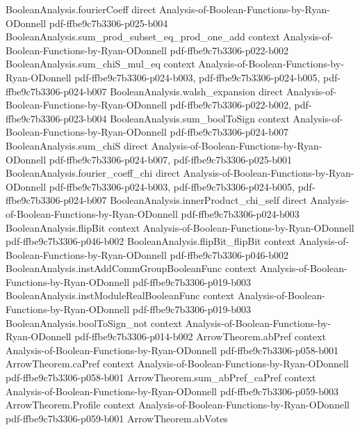 \begin{lemma}
\proofstep
  {BooleanAnalysis.fourierCoeff}
  {direct}
  {Analysis-of-Boolean-Functions-by-Ryan-ODonnell}
  {pdf-ffbe9c7b3306-p025-b004}
\proofstep
  {BooleanAnalysis.sum_prod_subset_eq_prod_one_add}
  {context}
  {Analysis-of-Boolean-Functions-by-Ryan-ODonnell}
  {pdf-ffbe9c7b3306-p022-b002}
\proofstep
  {BooleanAnalysis.sum_chiS_mul_eq}
  {context}
  {Analysis-of-Boolean-Functions-by-Ryan-ODonnell}
  {pdf-ffbe9c7b3306-p024-b003,
    pdf-ffbe9c7b3306-p024-b005,
    pdf-ffbe9c7b3306-p024-b007}
\proofstep
  {BooleanAnalysis.walsh_expansion}
  {direct}
  {Analysis-of-Boolean-Functions-by-Ryan-ODonnell}
  {pdf-ffbe9c7b3306-p022-b002,
    pdf-ffbe9c7b3306-p023-b004}
\proofstep
  {BooleanAnalysis.sum_boolToSign}
  {context}
  {Analysis-of-Boolean-Functions-by-Ryan-ODonnell}
  {pdf-ffbe9c7b3306-p024-b007}
\proofstep
  {BooleanAnalysis.sum_chiS}
  {direct}
  {Analysis-of-Boolean-Functions-by-Ryan-ODonnell}
  {pdf-ffbe9c7b3306-p024-b007,
    pdf-ffbe9c7b3306-p025-b001}
\proofstep
  {BooleanAnalysis.fourier_coeff_chi}
  {direct}
  {Analysis-of-Boolean-Functions-by-Ryan-ODonnell}
  {pdf-ffbe9c7b3306-p024-b003,
    pdf-ffbe9c7b3306-p024-b005,
    pdf-ffbe9c7b3306-p024-b007}
\proofstep
  {BooleanAnalysis.innerProduct_chi_self}
  {direct}
  {Analysis-of-Boolean-Functions-by-Ryan-ODonnell}
  {pdf-ffbe9c7b3306-p024-b003}
\proofstep
  {BooleanAnalysis.flipBit}
  {context}
  {Analysis-of-Boolean-Functions-by-Ryan-ODonnell}
  {pdf-ffbe9c7b3306-p046-b002}
\proofstep
  {BooleanAnalysis.flipBit_flipBit}
  {context}
  {Analysis-of-Boolean-Functions-by-Ryan-ODonnell}
  {pdf-ffbe9c7b3306-p046-b002}
\proofstep
  {BooleanAnalysis.instAddCommGroupBooleanFunc}
  {context}
  {Analysis-of-Boolean-Functions-by-Ryan-ODonnell}
  {pdf-ffbe9c7b3306-p019-b003}
\proofstep
  {BooleanAnalysis.instModuleRealBooleanFunc}
  {context}
  {Analysis-of-Boolean-Functions-by-Ryan-ODonnell}
  {pdf-ffbe9c7b3306-p019-b003}
\proofstep
  {BooleanAnalysis.boolToSign_not}
  {context}
  {Analysis-of-Boolean-Functions-by-Ryan-ODonnell}
  {pdf-ffbe9c7b3306-p014-b002}
\proofstep
  {ArrowTheorem.abPref}
  {context}
  {Analysis-of-Boolean-Functions-by-Ryan-ODonnell}
  {pdf-ffbe9c7b3306-p058-b001}
\proofstep
  {ArrowTheorem.caPref}
  {context}
  {Analysis-of-Boolean-Functions-by-Ryan-ODonnell}
  {pdf-ffbe9c7b3306-p058-b001}
\proofstep
  {ArrowTheorem.sum_abPref_caPref}
  {context}
  {Analysis-of-Boolean-Functions-by-Ryan-ODonnell}
  {pdf-ffbe9c7b3306-p059-b003}
\proofstep
  {ArrowTheorem.Profile}
  {context}
  {Analysis-of-Boolean-Functions-by-Ryan-ODonnell}
  {pdf-ffbe9c7b3306-p059-b001}
\proofstep
  {ArrowTheorem.abVotes}

\end{lemma}
